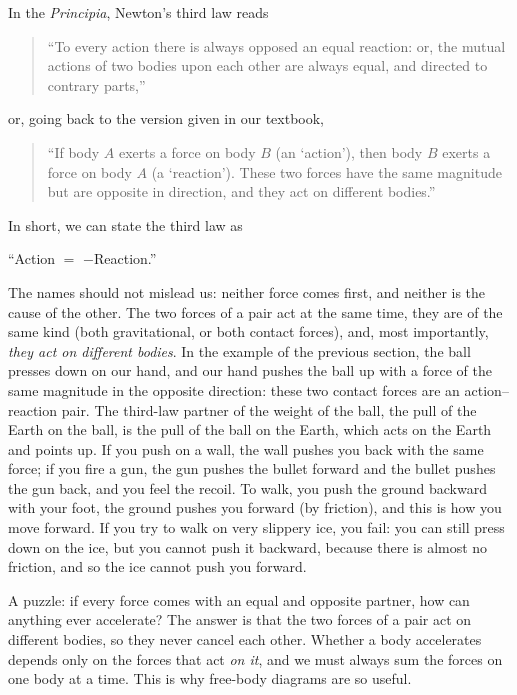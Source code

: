 \documentclass[11pt,a4paper]{article}
\begin{document}
In the \emph{Principia}, Newton's third law reads
\begin{quote}
``To every action there is always opposed an equal reaction: or, the mutual actions of two bodies
upon each other are always equal, and directed to contrary parts,''
\end{quote}
or, going back to the version given in our textbook,
\begin{quote}
``If body $A$ exerts a force on body $B$ (an `action'), then body $B$ exerts a force on body $A$ (a
`reaction'). These two forces have the same magnitude but are opposite in direction, and they act on
different bodies.''
\end{quote}
In short, we can state the third law as
\begin{center}
``Action $=$ $-$Reaction.''
\end{center}
The names should not mislead us: neither force comes first, and neither is the cause of the other.
The two forces of a pair act at the same time, they are of the same kind (both gravitational, or
both contact forces), and, most importantly, \emph{they act on different bodies}. In the example of
the previous section, the ball presses down on our hand, and our hand pushes the ball up with a
force of the same magnitude in the opposite direction: these two contact forces are an
action--reaction pair. The third-law partner of the weight of the ball, the pull of the Earth on the
ball, is the pull of the ball on the Earth, which acts on the Earth and points up. If you push on a
wall, the wall pushes you back with the same force; if you fire a gun, the gun pushes the bullet
forward and the bullet pushes the gun back, and you feel the recoil. To walk, you push the ground
backward with your foot, the ground pushes you forward (by friction), and this is how you move
forward. If you try to walk on very slippery ice, you fail: you can still press down on the ice, but
you cannot push it backward, because there is almost no friction, and so the ice cannot push you
forward.

A puzzle: if every force comes with an equal and opposite partner, how can anything ever
accelerate? The answer is that the two forces of a pair act on different bodies, so they never
cancel each other. Whether a body accelerates depends only on the forces that act \emph{on it}, and
we must always sum the forces on one body at a time. This is why free-body diagrams are so useful.
\end{document}
